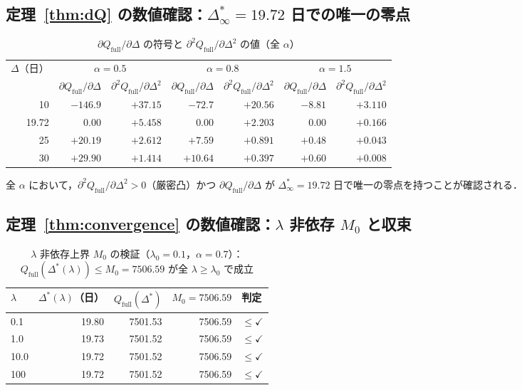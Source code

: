 \documentclass[12pt,a4paper]{article}
\theoremstyle{plain}
\theoremstyle{definition}
\theoremstyle{remark}
\newcommand{\Qf}{Q_{\mathrm{full}}}
\newcommand{\Dopt}{\Delta^{*}}
\newcommand{\Dinf}{\Delta^{*}_{\infty}}
\begin{document}
\subsection{定理~\ref{thm:dQ} の数値確認：$\Dinf=19.72$ 日での唯一の零点}

\begin{table}[H]
\centering
\caption{$\partial\Qf/\partial\Delta$ の符号と $\partial^2\Qf/\partial\Delta^2$ の値（全 $\alpha$）}
\label{tab:dQ}
\begin{tabular}{@{}rrrrrrr@{}}
\toprule
\multirow{2}{*}{$\Delta$（日）} &
\multicolumn{2}{c}{$\alpha=0.5$} &
\multicolumn{2}{c}{$\alpha=0.8$} &
\multicolumn{2}{c}{$\alpha=1.5$} \\
\cmidrule{2-3}\cmidrule{4-5}\cmidrule{6-7}
& $\partial\Qf/\partial\Delta$ & $\partial^2\Qf/\partial\Delta^2$ &
$\partial\Qf/\partial\Delta$ & $\partial^2\Qf/\partial\Delta^2$ &
$\partial\Qf/\partial\Delta$ & $\partial^2\Qf/\partial\Delta^2$ \\
\midrule
10    & $-146.9$ & $+37.15$ & $-72.7$ & $+20.56$ & $-8.81$ & $+3.110$ \\
19.72 & $0.00$   & $+5.458$ & $0.00$  & $+2.203$ & $0.00$  & $+0.166$ \\
25    & $+20.19$ & $+2.612$ & $+7.59$ & $+0.891$ & $+0.48$ & $+0.043$ \\
30    & $+29.90$ & $+1.414$ & $+10.64$ & $+0.397$ & $+0.60$ & $+0.008$ \\
\bottomrule
\end{tabular}
\end{table}

全 $\alpha$ において，$\partial^2\Qf/\partial\Delta^2>0$（厳密凸）かつ $\partial\Qf/\partial\Delta$ が
$\Dinf=19.72$ 日で唯一の零点を持つことが確認される．

\subsection{定理~\ref{thm:convergence} の数値確認：$\lambda$ 非依存 $M_0$ と収束}

\begin{table}[H]
\centering
\caption{$\lambda$ 非依存上界 $M_0$ の検証（$\lambda_0=0.1$，$\alpha=0.7$）：
$\Qf(\Dopt(\lambda))\le M_0=7506.59$ が全 $\lambda\ge\lambda_0$ で成立}
\label{tab:compact}
\begin{tabular}{@{}lrrrl@{}}
\toprule
$\lambda$ & $\Dopt(\lambda)$（日）& $\Qf(\Dopt)$ & $M_0=7506.59$ & 判定 \\
\midrule
0.1  & 19.80 & 7501.53 & 7506.59 & $\le\checkmark$ \\
1.0  & 19.73 & 7501.52 & 7506.59 & $\le\checkmark$ \\
10.0 & 19.72 & 7501.52 & 7506.59 & $\le\checkmark$ \\
100  & 19.72 & 7501.52 & 7506.59 & $\le\checkmark$ \\
\bottomrule
\end{tabular}
\end{table}
\end{document}
